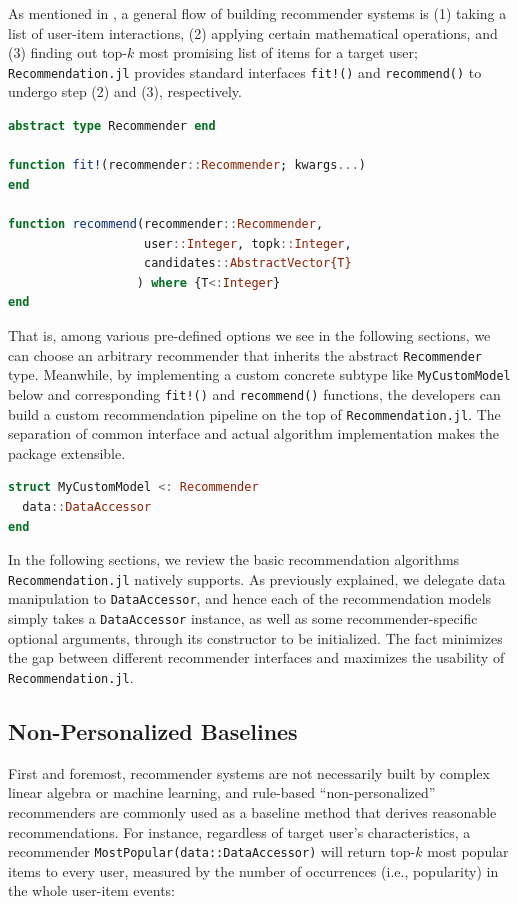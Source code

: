 As mentioned in , a general flow of building recommender systems is (1) taking a list of user-item interactions, (2) applying certain mathematical operations, and (3) finding out top-$k$ most promising list of items for a target user; \texttt{Recommendation.jl} provides standard interfaces \texttt{fit!()} and \texttt{recommend()} to undergo step (2) and (3), respectively. 

\begin{lstlisting}[language = Julia]
abstract type Recommender end

function fit!(recommender::Recommender; kwargs...)
end

function recommend(recommender::Recommender, 
                   user::Integer, topk::Integer, 
                   candidates::AbstractVector{T}
                  ) where {T<:Integer}
end
\end{lstlisting}

That is, among various pre-defined options we see in the following sections, we can choose an arbitrary recommender that inherits the abstract \texttt{Recommender} type. Meanwhile, by implementing a custom concrete subtype like \texttt{MyCustomModel} below and corresponding \texttt{fit!()} and \texttt{recommend()} functions, the developers can build a custom recommendation pipeline on the top of \texttt{Recommendation.jl}. The separation of common interface and actual algorithm implementation makes the package extensible.

\begin{lstlisting}[language = Julia]
struct MyCustomModel <: Recommender 
  data::DataAccessor
end
\end{lstlisting}

In the following sections, we review the basic recommendation algorithms \texttt{Recommendation.jl} natively supports. As previously explained, we delegate data manipulation to \texttt{DataAccessor}, and hence each of the recommendation models simply takes a \texttt{DataAccessor} instance, as well as some recommender-specific optional arguments, through its constructor to be initialized. The fact minimizes the gap between different recommender interfaces and maximizes the usability of \texttt{Recommendation.jl}.

\subsection{Non-Personalized Baselines}

First and foremost, recommender systems are not necessarily built by complex linear algebra or machine learning, and rule-based ``non-personalized'' recommenders are commonly used as a baseline method that derives reasonable recommendations. For instance, regardless of target user's characteristics, a recommender \texttt{MostPopular(data::DataAccessor)} will return top-$k$ most popular items to every user, measured by the number of occurrences (i.e., popularity) in the whole user-item events:

